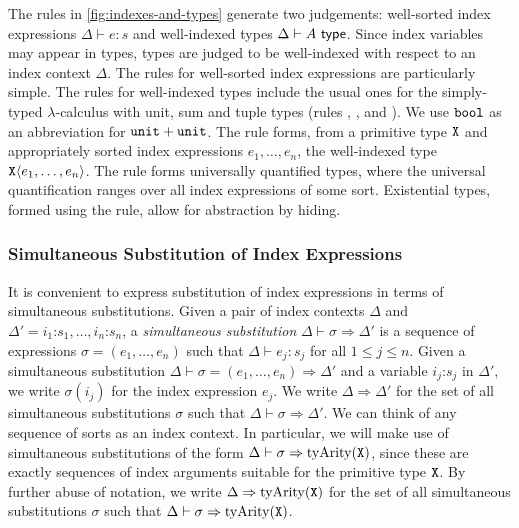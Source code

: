 The rules in \autoref{fig:indexes-and-types}
generate two judgements: well-sorted index expressions $\Delta \vdash
e : s$ and well-indexed types $\Delta \vdash A \textup{\textsf{ type}}$. Since index
variables may appear in types, types are judged to be well-indexed
with respect to an index context $\Delta$. The rules for well-sorted
index expressions are particularly simple. %
The rules for well-indexed types include the usual ones
for
the simply-typed $\lambda$-calculus with unit, sum and tuple types
(rules , ,  and
). 
We use $\textup{\texttt{bool}}$ as an abbreviation for $\textup{\texttt{unit}} + \textup{\texttt{unit}}$.
The rule  %
forms, from a primitive type $\textup{\texttt{X}}$ and appropriately sorted
index expressions $e_1,\ldots,e_n$, the well-indexed type
$\textup{\texttt{X}}\langle e_1,\ldots,e_n \rangle$. The rule  
forms universally quantified types, where the universal
quantification ranges over all index expressions of some
sort. Existential types, %
formed using the  rule,
allow for abstraction by hiding. %

\subsubsection{Simultaneous Substitution of Index Expressions}
\label{sec:simultaneous-substitution}

It %
is convenient to express substitution of index
expressions %
in terms of simultaneous substitutions.
Given a pair of index contexts $\Delta$ and $\Delta' = i_1 \mathord:
s_1, \ldots, i_n \mathord: s_n$, a \emph{simultaneous substitution}
$\Delta \vdash \sigma \Rightarrow \Delta'$ is a sequence of
expressions $\sigma = (e_1,\ldots,e_n)$ such that $\Delta \vdash e_j :
s_j$ for all $1 \leq j \leq n$. Given a simultaneous substitution
$\Delta \vdash \sigma = (e_1,\ldots,e_n) \Rightarrow \Delta'$ and a
variable $i_j \mathord: s_j$ in $\Delta'$, we write $\sigma(i_j)$ for
the index expression $e_j$. We write $\Delta \Rightarrow \Delta'$ for
the set of all simultaneous substitutions $\sigma$ such that $\Delta
\vdash \sigma \Rightarrow \Delta'$.
%
We can think of any sequence of sorts as an index
context. In particular, we will make use of simultaneous substitutions
of the form $\Delta \vdash \sigma \Rightarrow
\mathrm{tyArity}(\textup{\texttt{X}})$, since these are exactly sequences of
index arguments suitable for the primitive type $\textup{\texttt{X}}$. By
further abuse of notation, we write $\Delta \Rightarrow
\mathrm{tyArity}(\textup{\texttt{X}})$ for the set of all simultaneous
substitutions $\sigma$ such that $\Delta \vdash \sigma \Rightarrow
\mathrm{tyArity}(\textup{\texttt{X}})$.

